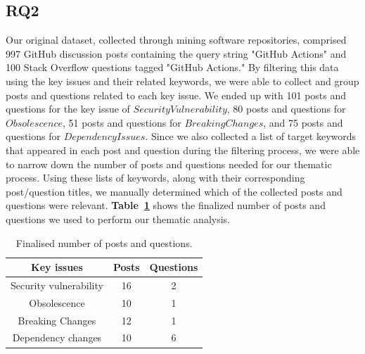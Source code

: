 \documentclass[conference]{IEEEtran}
\begin{document}
  \subsection{RQ2}
Our original dataset, collected through mining software repositories, comprised 997 GitHub discussion posts containing the query string "GitHub Actions" and 100 Stack Overflow questions tagged "GitHub Actions." By filtering this data using the key issues and their related keywords, we were able to collect and group posts and questions related to each key issue. We ended up with 101 posts and questions for the key issue of $Security Vulnerability$, 80 posts and questions for $Obsolescence$, 51 posts and questions for $Breaking Changes$, and 75 posts and questions for $Dependency Issues$. Since we also collected a list of target keywords that appeared in each post and question during the filtering process, we were able to narrow down the number of posts and questions needed for our thematic process. Using these lists of keywords, along with their corresponding post/question titles, we manually determined which of the collected posts and questions were relevant. \textbf{Table~\ref{tab:number_data}} shows the finalized number of posts and questions we used to perform our thematic analysis.
\begin{table}[H]
\centering
\caption{Finalised number of posts and questions.}
\label{tab:number_data}
\begin{tabular}{|c|c|c|}
  \hline
  \textbf{Key issues} & \textbf{Posts}  & \textbf{Questions} \\
  \hline
  \hline
    Security vulnerability & 16 &  2  \\
  \hline
   Obsolescence & 10  & 1 \\
  \hline
  \hline
   Breaking Changes & 12 & 1 \\
  \hline
  \hline
   Dependency changes & 10 & 6  \\
  \hline
\end{tabular}
\end{table}
\end{document}
